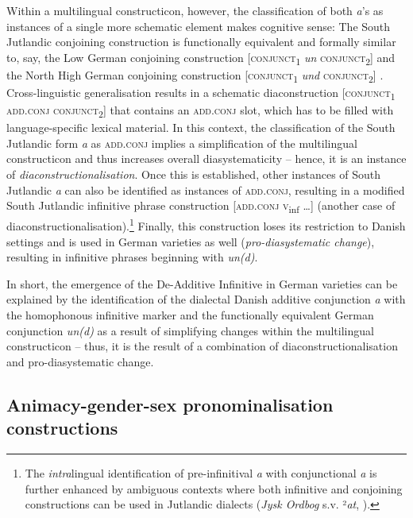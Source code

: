 \documentclass[output=paper]{langsci/langscibook}
\begin{document}
Within a multilingual constructicon, however, the classification of both \textit{a}’s as instances of a single more schematic element makes cognitive sense: The South Jutlandic conjoining construction is functionally equivalent and formally similar to, say, the Low German conjoining construction {[}\textsc{conjunct}\textsubscript{1} \textit{un} \textsc{conjunct}\textsubscript{2}{]} and the North High German conjoining construction {[}\textsc{conjunct}\textsubscript{1} \textit{und} \textsc{conjunct}\textsubscript{2}{]} . Cross-linguistic generalisation results in a schematic diaconstruction {[}\textsc{conjunct}\textsubscript{1} \textsc{add.conj} \textsc{conjunct}\textsubscript{2}{]}  that contains an \textsc{add.conj} slot, which has to be filled with language-specific lexical material. In this context, the classification of the South Jutlandic form \textit{a} as \textsc{add.conj} implies a simplification of the multilingual constructicon and thus increases overall diasystematicity -- hence, it is an instance of \textit{diaconstructionalisation}. Once this is established, other instances of South Jutlandic \textit{a} can also be identified as instances of \textsc{add.conj}, resulting in a modified South Jutlandic infinitive phrase construction {[}\textsc{add.conj} \textsc{v}\textsubscript{inf} …{]}  (another case of diaconstructionalisation).\footnote{The \textit{intra}lingual identification of pre-infinitival \textit{a} with conjunctional \textit{a} is further enhanced by ambiguous contexts where both infinitive and conjoining constructions can be used in Jutlandic dialects (\textit{Jysk Ordbog} s.v. ²\textit{at}, ).}\textsuperscript{} Finally, this construction loses its restriction to Danish settings and is used in German varieties as well (\textit{pro-diasystematic change}), resulting in infinitive phrases beginning with \textit{un(d)}.

In short, the emergence of the De-Additive Infinitive in German varieties can be explained by the identification of the dialectal Danish additive conjunction \textit{a} with the homophonous infinitive marker and the functionally equivalent German conjunction \textit{un(d)} as a result of simplifying changes within the multilingual constructicon – thus, it is the result of a combination of diaconstructionalisation and pro-diasystematic change.


 
 \subsection{Animacy-gender-sex pronominalisation constructions}
 \label{sec:hoeder:4.4}
\end{document}
